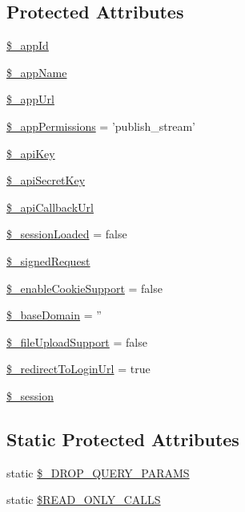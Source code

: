 \subsection*{Protected Attributes}
\begin{DoxyCompactItemize}
\item 
\hyperlink{classCPSFacebook_a26f5b0452f151ceda4f18979a5eb1058}{\$\_\-appId}
\item 
\hyperlink{classCPSFacebook_ab1025f24b9ab01061327e23b10552116}{\$\_\-appName}
\item 
\hyperlink{classCPSFacebook_a4416500680a7b92e95184727c36eec91}{\$\_\-appUrl}
\item 
\hyperlink{classCPSFacebook_a6adcddc9592544d2e65aed888e2bfdfa}{\$\_\-appPermissions} = 'publish\_\-stream'
\item 
\hyperlink{classCPSFacebook_a30d859488ed1921f08a7e8191363d9a4}{\$\_\-apiKey}
\item 
\hyperlink{classCPSFacebook_ae5bcbc03d954a2feca80ddd77054501d}{\$\_\-apiSecretKey}
\item 
\hyperlink{classCPSFacebook_a98f1263247e46ae35ef0b714c702d0bd}{\$\_\-apiCallbackUrl}
\item 
\hyperlink{classCPSFacebook_aee8e9816087942dab4fb8bd62f413cd6}{\$\_\-sessionLoaded} = false
\item 
\hyperlink{classCPSFacebook_a6b432430b58baf6351a7507208363d80}{\$\_\-signedRequest}
\item 
\hyperlink{classCPSFacebook_a6302bfba02d83c085b22d2aea1fc3bd6}{\$\_\-enableCookieSupport} = false
\item 
\hyperlink{classCPSFacebook_ac054a508d06da60c6ffc3aab3fd7b3e7}{\$\_\-baseDomain} = ''
\item 
\hyperlink{classCPSFacebook_a851bf23affeafd6281b06ff919d23a7f}{\$\_\-fileUploadSupport} = false
\item 
\hyperlink{classCPSFacebook_a26d05a26685e4c898e34328911b708d3}{\$\_\-redirectToLoginUrl} = true
\item 
\hyperlink{classCPSFacebook_ad0641deaf4d314f034a134efaa6fbff0}{\$\_\-session}
\end{DoxyCompactItemize}
\subsection*{Static Protected Attributes}
\begin{DoxyCompactItemize}
\item 
static \hyperlink{classCPSFacebook_aced13da18a88b032dcdbe41db9c09ed3}{\$\_\-DROP\_\-QUERY\_\-PARAMS}
\item 
static \hyperlink{classCPSFacebook_ae5e971be39413de8adc0e47624dbee86}{\$READ\_\-ONLY\_\-CALLS}
\end{DoxyCompactItemize}


